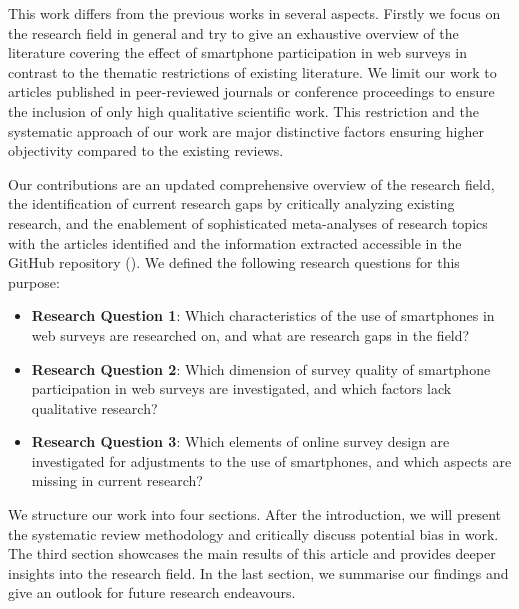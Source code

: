 This work differs from the previous works in several aspects. Firstly we focus on the research field in general and try to give an exhaustive overview of the literature covering the effect of smartphone participation in web surveys in contrast to the thematic restrictions of existing literature. We limit our work to articles published in peer-reviewed journals or conference proceedings to ensure the inclusion of only high qualitative scientific work. This restriction and the systematic approach of our work are major distinctive factors ensuring higher objectivity compared to the existing reviews.  

Our contributions are an updated comprehensive overview of the research field, the identification of current research gaps by critically analyzing existing research, and the enablement of sophisticated meta-analyses of research topics with the articles identified and the information extracted accessible in the GitHub repository (\cite{langenbahn_smartphone_2021}). We defined the following research questions for this purpose:

\begin{itemize}
   \item \textbf{Research Question 1}: Which characteristics of the use of smartphones in web surveys are researched on, and what are research gaps in the field? 
   \item \textbf{Research Question 2}: Which dimension of survey quality of smartphone participation in web surveys are investigated, and which factors lack qualitative research?
   \item \textbf{Research Question 3}: Which elements of online survey design are investigated for adjustments to the use of smartphones, and which aspects are missing in current research?
\end{itemize}

We structure our work into four sections. After the introduction, we will present the systematic review methodology and critically discuss potential bias in work. The third section showcases the main results of this article and provides deeper insights into the research field. In the last section, we summarise our findings and give an outlook for future research endeavours. 
